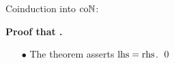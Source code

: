 \begin{frame}[t]{Coinduction into $\mathrm{co}\mathbb{N}$: \currentGoal} %
  \simpleCoindNBlock

  \par\textbf{Proof that \currentGoal.}
  \begin{itemize}
    \item[$\bullet$] {
      The theorem asserts $\mathrm{lhs} = \mathrm{rhs}$.
      \qed
    }
  \end{itemize}
  
\end{frame}
